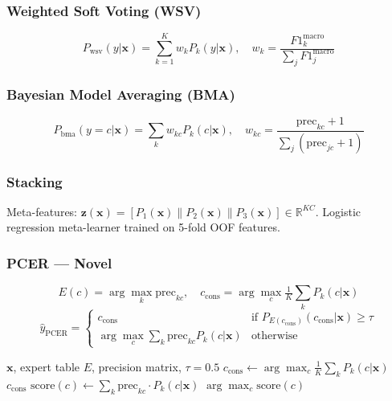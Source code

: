 \documentclass[conference]{IEEEtran}
\begin{document}
\subsubsection{Weighted Soft Voting (WSV)}
\begin{equation}
  P_{\text{wsv}}(y|\mathbf{x}) = \sum_{k=1}^{K} w_k P_k(y|\mathbf{x}),
  \quad w_k = \frac{F1_k^{\text{macro}}}{\sum_j F1_j^{\text{macro}}}
  \label{eq:wsv}
\end{equation}

\subsubsection{Bayesian Model Averaging (BMA)~\cite{hoeting1999}}
\begin{equation}
  P_{\text{bma}}(y{=}c|\mathbf{x}) = \sum_k w_{kc} P_k(c|\mathbf{x}),
  \quad w_{kc} = \frac{\text{prec}_{kc}+1}{\sum_j(\text{prec}_{jc}+1)}
  \label{eq:bma}
\end{equation}

\subsubsection{Stacking~\cite{wolpert1992}}
Meta-features: $\mathbf{z}(\mathbf{x}) = [P_1(\mathbf{x})\|P_2(\mathbf{x})\|P_3(\mathbf{x})] \in \mathbb{R}^{KC}$.
Logistic regression meta-learner trained on 5-fold OOF features.

\subsubsection{PCER --- Novel}
\begin{equation}
  E(c) = \arg\max_k \text{prec}_{kc}, \quad
  c_{\text{cons}} = \arg\max_c \tfrac{1}{K}\textstyle\sum_k P_k(c|\mathbf{x})
  \label{eq:pcer_expert}
\end{equation}
\begin{equation}
  \hat{y}_{\text{PCER}} = \begin{cases}
    c_{\text{cons}} & \text{if } P_{E(c_{\text{cons}})}(c_{\text{cons}}|\mathbf{x})\geq\tau \\
    \arg\max_c \sum_k \text{prec}_{kc} P_k(c|\mathbf{x}) & \text{otherwise}
  \end{cases}
  \label{eq:pcer_pred}
\end{equation}

\begin{algorithm}[t]
\caption{PCER Routing}
\label{alg:pcer}
\begin{algorithmic}[1]
\REQUIRE $\mathbf{x}$, expert table $E$, precision matrix, $\tau{=}0.5$
\STATE $c_{\text{cons}} \leftarrow \arg\max_c \frac{1}{K}\sum_k P_k(c|\mathbf{x})$
  \RETURN $c_{\text{cons}}$
\ELSE
  \STATE $\text{score}(c) \leftarrow \sum_k \text{prec}_{kc} \cdot P_k(c|\mathbf{x})$
  \RETURN $\arg\max_c \text{score}(c)$
\ENDIF
\end{algorithmic}
\end{algorithm}
\end{document}
